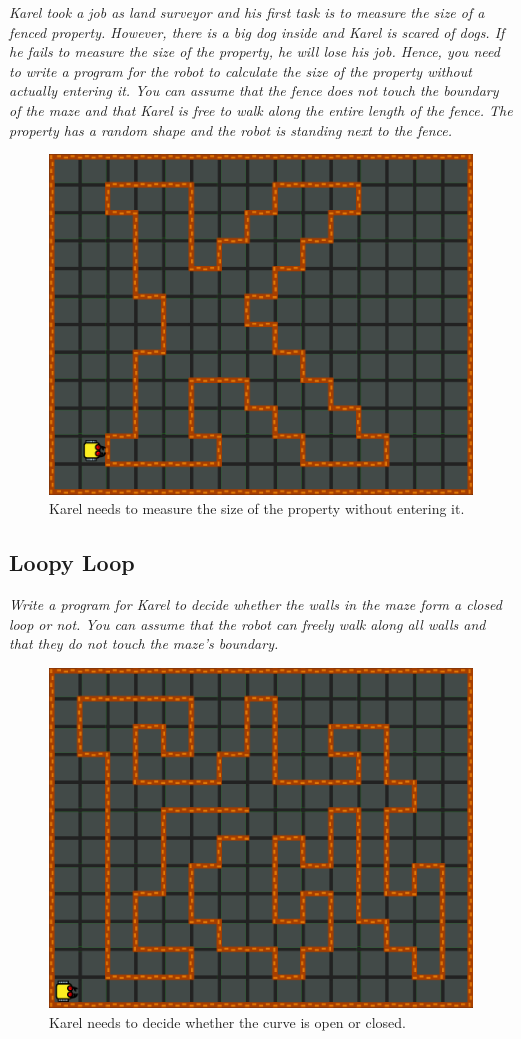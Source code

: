{{\noindent
{\em Karel took a job as land surveyor and his first task is to measure the size of a fenced property. However, there is a big dog inside and Karel is scared of dogs. If he fails to measure the size of the property, he will lose his job. Hence, you need to write a program for the robot to calculate the size of the property without actually entering it. You can assume that the fence does not touch the boundary of the maze and that Karel is free to walk along the entire length of the fence. The property has a random shape and the robot is standing next to the fence.}

\begin{figure}[!ht]
\begin{center}
\includegraphics[height=0.4\textwidth]{img/j01.png}
\end{center}
\vspace{-4mm}
\caption{Karel needs to measure the size of the property without entering it.}
\label{fig:j01}
\end{figure}

\newpage
\subsection{Loopy Loop}

\noindent
{\em Write a program for Karel to decide whether the walls in the maze form a closed loop or not. You can assume that the robot can freely walk along all walls and that they do not touch the maze's boundary.  }

\begin{figure}[!ht]
\begin{center}
\includegraphics[height=0.4\textwidth]{img/j03.png}
\end{center}
\vspace{-4mm}
\caption{Karel needs to decide whether the curve is open or closed.}
\label{fig:j03}
\end{figure}


}}
